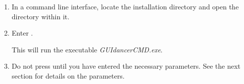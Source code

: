
\begin{enumerate}
\item In a command line interface, locate the \gd{} installation directory and open the \gd{} directory within it. 
\item Enter . 

This will run the executable \emph{GUIdancerCMD.exe}.
\item Do not press  until you have entered the necessary parameters. See the next section for details on the parameters.
\end{enumerate}
